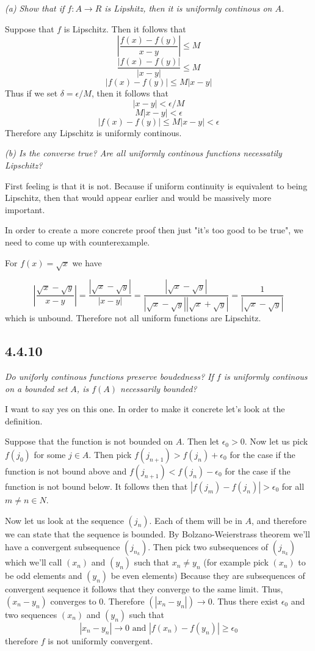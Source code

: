 \documentclass[11pt,oneside,titlepage]{book}
\begin{document}
\textit{(a) Show that if $f: A \to R$ is Lipshitz, then it is uniformly
  continous on $A$. }

Suppose that $f$ is Lipschitz. Then it follows that
$$\left|\frac{f(x) - f(y)}{x - y}\right| \leq M$$
$$\frac{|f(x) - f(y)|}{|x - y|} \leq M$$
$$|f(x) - f(y)| \leq M|x - y|$$
Thus if we set $\delta = \epsilon/M$, then it follows that
$$|x - y| < \epsilon/M$$
$$M|x - y| < \epsilon$$
$$|f(x) - f(y)| \leq M|x - y| < \epsilon$$
Therefore any Lipschitz is uniformly continous.

\textit{(b) Is the converse true? Are all uniformly continous functions
  necessatily Lipschitz?}

First feeling is that it is not. Because if uniform continuity is equivalent
to being Lipschitz, then that would appear earlier and would be massively more
important.

In order to create a more concrete proof then just
"it's too good to be true", we need to come up with counterexample.

For $f(x) = \sqrt{x}$ we have 

$$\left|\frac{\sqrt{x} - \sqrt{y}}{x - y}\right| =
\frac{|\sqrt{x} - \sqrt{y}|}{|x - y|} =
\frac{|\sqrt{x} - \sqrt{y}|}{|\sqrt{x} - \sqrt{y}||\sqrt{x} + \sqrt{y}|} =
\frac{1}{|\sqrt{x} - \sqrt{y}|}$$
which is unbound. Therefore not all uniform functions are Lipschitz.

\subsection*{4.4.10}
\textit{Do uniforly continous functions preserve boudedness? If $f$ is
  uniformly continous on a bounded set $A$, is $f(A)$ necessarily bounded?}

I want to say yes on this one. In order to make it concrete let's look at
the definition.

Suppose that the function is not bounded on $A$. Then
let $\epsilon_0 > 0$. 
Now let us pick $f(j_0)$ for some $j \in A$.
Then pick $f(j_{n + 1}) > f(j_n) + \epsilon_0$ for the case if the function is
not bound above and $f(j_{n + 1}) < f(j_n) - \epsilon_0$ for the case if the
function is not bound below. It follows then
that $|f(j_{m}) - f(j_n)| > \epsilon_0$ for all $m \neq n \in N$.

Now let us look at the sequence $(j_n)$. Each of them will be in $A$, and
therefore we can state that the sequence is bounded.
By Bolzano-Weierstrass theorem we'll have a convergent 
subsequence $(j_{n_k})$. Then pick two subsequences of $(j_{n_k})$ which
we'll call $(x_n)$ and $(y_n)$ such that $x_n \neq y_n$ (for example pick
$(x_n)$ to be odd elements and $(y_n)$ be even elements)
Because they are subsequences of convergent
sequence it follows that they converge to the same limit. Thus,
$(x_n - y_n)$ converges to 0. Therefore $(|x_n - y_n|) \to 0$. Thus there
exist $\epsilon_0$ and  two sequences $(x_n)$ and $(y_n)$ such that
$$|x_n - y_n| \to 0 \text{ and } |f(x_n) - f(y_n)| \geq \epsilon_0$$
therefore $f$ is not uniformly convergent.
\end{document}
